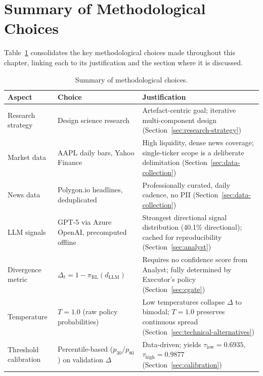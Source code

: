\section{Summary of Methodological Choices}
\label{sec:method-summary}

Table~\ref{tab:method-summary} consolidates the key methodological choices
made throughout this chapter, linking each to its justification and the
section where it is discussed.

\begin{table}[ht]
\centering
\caption{Summary of methodological choices.}
\label{tab:method-summary}
\small
\begin{tabular}{@{}p{3.2cm}p{4.5cm}p{5.8cm}@{}}
\toprule
\textbf{Aspect} & \textbf{Choice} & \textbf{Justification} \\
\midrule
Research strategy
  & Design science research~\cite{johannesson2014design}
  & Artefact-centric goal; iterative multi-component design
    (Section~\ref{sec:research-strategy}) \\[4pt]

Market data
  & AAPL daily bars, Yahoo Finance
  & High liquidity, dense news coverage; single-ticker scope is a
    deliberate delimitation
    (Section~\ref{sec:data-collection}) \\[4pt]

News data
  & Polygon.io headlines, deduplicated
  & Professionally curated, daily cadence, no PII
    (Section~\ref{sec:data-collection}) \\[4pt]

LLM signals
  & GPT-5 via Azure OpenAI, precomputed offline
  & Strongest directional signal distribution (40.1\% directional);
    cached for reproducibility
    (Section~\ref{sec:analyst}) \\[4pt]

Divergence metric
  & $\Delta_t = 1 - \pi_{\mathrm{RL}}(d_{\mathrm{LLM}})$
  & Requires no confidence score from Analyst; fully determined by
    Executor's policy
    (Section~\ref{sec:cgate}) \\[4pt]

Temperature
  & $T = 1.0$ (raw policy probabilities)
  & Low temperatures collapse $\Delta$ to bimodal; $T=1.0$ preserves
    continuous spread
    (Section~\ref{sec:technical-alternatives}) \\[4pt]

Threshold calibration
  & Percentile-based ($p_{30}$/$p_{80}$) on validation $\Delta$
  & Data-driven; yields $\tau_{\mathrm{low}} = 0.6935$,
    $\tau_{\mathrm{high}} = 0.9877$
    (Section~\ref{sec:calibration}) \\[4pt]


\end{tabular}
\end{table}
